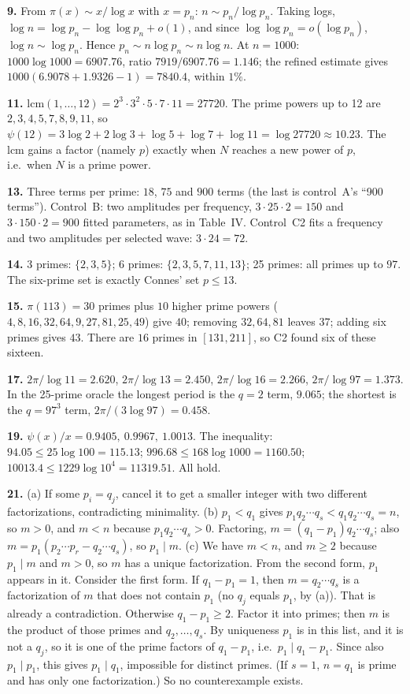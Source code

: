 \textbf{9.} From $\pi(x)\sim x/\log x$ with $x=p_n$: $n\sim p_n/\log p_n$. Taking logs, $\log n=\log p_n-\log\log p_n+o(1)$, and since $\log\log p_n=o(\log p_n)$, $\log n\sim\log p_n$. Hence $p_n\sim n\log p_n\sim n\log n$. At $n=1000$: $1000\log1000=6907.76$, ratio $7919/6907.76=1.146$; the refined estimate gives $1000(6.9078+1.9326-1)=7840.4$, within $1\%$.

\textbf{11.} $\mathrm{lcm}(1,\dots,12)=2^3\cdot3^2\cdot5\cdot7\cdot11=27720$. The prime powers up to 12 are $2,3,4,5,7,8,9,11$, so $\psi(12)=3\log2+2\log3+\log5+\log7+\log11=\log27720\approx10.23$. The lcm gains a factor (namely $p$) exactly when $N$ reaches a new power of $p$, i.e.\ when $N$ is a prime power.

\textbf{13.} Three terms per prime: $18$, $75$ and $900$ terms (the last is control~A's ``900 terms''). Control~B: two amplitudes per frequency, $3\cdot25\cdot2=150$ and $3\cdot150\cdot2=900$ fitted parameters, as in Table~IV. Control~C2 fits a frequency and two amplitudes per selected wave: $3\cdot24=72$.

\textbf{14.} 3 primes: $\{2,3,5\}$; 6 primes: $\{2,3,5,7,11,13\}$; 25 primes: all primes up to $97$. The six-prime set is exactly Connes' set $p\le13$.

\textbf{15.} $\pi(113)=30$ primes plus $10$ higher prime powers ($4,8,16,32,64,9,27,81,25,49$) give $40$; removing $32,64,81$ leaves $37$; adding six primes gives $43$. There are $16$ primes in $[131,211]$, so C2 found six of these sixteen.

\textbf{17.} $2\pi/\log11=2.620$, $2\pi/\log13=2.450$, $2\pi/\log16=2.266$, $2\pi/\log97=1.373$. In the 25-prime oracle the longest period is the $q=2$ term, $9.065$; the shortest is the $q=97^3$ term, $2\pi/(3\log97)=0.458$.

\textbf{19.} $\psi(x)/x=0.9405,\ 0.9967,\ 1.0013$. The inequality: $94.05\le25\log100=115.13$; $996.68\le168\log1000=1160.50$; $10013.4\le1229\log10^4=11319.51$. All hold.

\textbf{21.} (a) If some $p_i=q_j$, cancel it to get a smaller integer with two different factorizations, contradicting minimality. (b) $p_1<q_1$ gives $p_1q_2\cdots q_s<q_1q_2\cdots q_s=n$, so $m>0$, and $m<n$ because $p_1q_2\cdots q_s>0$. Factoring, $m=(q_1-p_1)q_2\cdots q_s$; also $m=p_1(p_2\cdots p_r-q_2\cdots q_s)$, so $p_1\mid m$. (c) We have $m<n$, and $m\ge2$ because $p_1\mid m$ and $m>0$, so $m$ has a unique factorization. From the second form, $p_1$ appears in it. Consider the first form. If $q_1-p_1=1$, then $m=q_2\cdots q_s$ is a factorization of $m$ that does not contain $p_1$ (no $q_j$ equals $p_1$, by (a)). That is already a contradiction. Otherwise $q_1-p_1\ge2$. Factor it into primes; then $m$ is the product of those primes and $q_2,\dots,q_s$. By uniqueness $p_1$ is in this list, and it is not a $q_j$, so it is one of the prime factors of $q_1-p_1$, i.e.\ $p_1\mid q_1-p_1$. Since also $p_1\mid p_1$, this gives $p_1\mid q_1$, impossible for distinct primes. (If $s=1$, $n=q_1$ is prime and has only one factorization.) So no counterexample exists.

